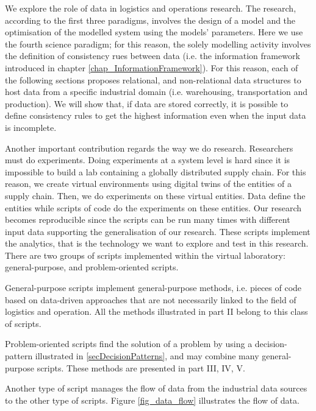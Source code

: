 We explore the role of data in logistics and operations research. The research, according to the first three paradigms, involves the design of a model and the optimisation of the modelled system using the models’ parameters. Here we use the fourth science paradigm; for this reason, the solely modelling activity involves the definition of consistency rues between data (i.e. the information framework introduced in chapter \ref{chap_InformationFramework}). For this reason, each of the following sections proposes relational, and non-relational data structures to host data from a specific industrial domain (i.e. warehousing, transportation and production). We will show that, if data are stored correctly, it is possible to define consistency rules to get the highest information even when the input data is incomplete. \par

Another important contribution regards the way we do research. Researchers must do experiments. Doing experiments at a system level is hard since it is impossible to build a lab containing a globally distributed supply chain. For this reason, we create virtual environments using digital twins of the entities of a supply chain. Then, we do experiments on these virtual entities. Data define the entities while scripts of code do the experiments on these entities. Our research becomes reproducible since the scripts can be run many times with different input data supporting the generalisation of our research. These scripts implement the analytics, that is the technology we want to explore and test in this research. There are two groups of scripts implemented within the virtual laboratory: general-purpose, and problem-oriented scripts.\par

General-purpose scripts implement general-purpose methods, i.e. pieces of code based on data-driven approaches that are not necessarily linked to the field of logistics and operation. All the methods illustrated in part II belong to this class of scripts.\par

Problem-oriented scripts find the solution of a problem by using a decision-pattern illustrated in \ref{secDecisionPatterns}, and may combine many general-purpose scripts. These methods are presented in part III, IV, V. \par

Another type of script manages the flow of data from the industrial data sources to the other type of scripts. Figure \ref{fig_data_flow} illustrates the flow of data. 

